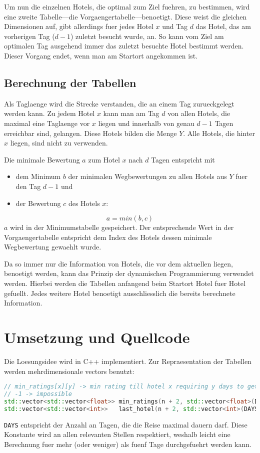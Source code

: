 \documentclass[a4paper,10pt,ngerman]{scrartcl}
\begin{document}
Um nun die einzelnen Hotels, die optimal zum Ziel fuehren, zu bestimmen, wird eine zweite Tabelle---die Vorgaengertabelle---benoetigt.
Diese weist die gleichen Dimensionen auf, gibt allerdings fuer jedes Hotel $x$ und Tag $d$ das Hotel, das am vorherigen Tag ($d-1$) zuletzt besucht wurde, an.
So kann vom Ziel am optimalen Tag ausgehend immer das zuletzt besuchte Hotel bestimmt werden.
Dieser Vorgang endet, wenn man am Startort angekommen ist.

\subsection{Berechnung der Tabellen}
Als Taglaenge wird die Strecke verstanden, die an einem Tag zurueckgelegt werden kann.
Zu jedem Hotel $x$ kann man am Tag $d$ von allen Hotels, die maximal eine Taglaenge vor $x$ liegen und innerhalb von genau $d-1$ Tagen erreichbar sind, gelangen.
Diese Hotels bilden die Menge $Y$.
Alle Hotels, die hinter $x$ liegen, sind nicht zu verwenden.

Die minimale Bewertung $a$ zum Hotel $x$ nach $d$ Tagen entspricht mit
\begin{itemize}
    \item dem Minimum $b$ der minimalen Wegbewertungen zu allen Hotels aus $Y$ fuer den Tag $d-1$ und
    \item der Bewertung $c$ des Hotels $x$:
\end{itemize}
\begin{equation*}
    a = min(b, c)
\end{equation*}
$a$ wird in der Minimumstabelle gespeichert.
Der entsprechende Wert in der Vorgaengertabelle entspricht dem Index des Hotels dessen minimale Wegbewertung gewaehlt wurde.

\medskip
Da so immer nur die Information von Hotels, die vor dem aktuellen liegen, benoetigt werden, kann das Prinzip der dynamischen Programmierung verwendet werden.
Hierbei werden die Tabellen anfangend beim Startort Hotel fuer Hotel gefuellt.
Jedes weitere Hotel benoetigt ausschliesslich die bereits berechnete Information.

\section{Umsetzung und Quellcode}
Die Loesungsidee wird in C++ implementiert.
Zur Repraesentation der Tabellen werden mehrdimensionale vectors benutzt:
\begin{lstlisting}[language=C++]
// min_ratings[x][y] -> min rating till hotel x requiring y days to get to
// -1 -> impossible
std::vector<std::vector<float>> min_ratings(n + 2, std::vector<float>(DAYS + 1, -1));
std::vector<std::vector<int>>   last_hotel(n + 2, std::vector<int>(DAYS + 1, -1));
\end{lstlisting}
\lstinline{DAYS} entspricht der Anzahl an Tagen, die die Reise maximal dauern darf.
Diese Konstante wird an allen relevanten Stellen respektiert, weshalb leicht eine Berechnung fuer mehr (oder weniger) als fuenf Tage durchgefuehrt werden kann.
\end{document}
